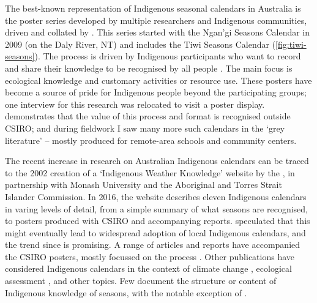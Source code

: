 The best-known representation of Indigenous seasonal calendars in Australia
is the poster series developed by multiple researchers and Indigenous
communities, driven and collated by \citet{CSIROcals}.  This series started with the
Ngan'gi Seasons Calendar in 2009 (on the Daly River, NT) and includes the Tiwi Seasons Calendar
(\cref{fig:tiwi-seasons}).  The process is driven by Indigenous participants
who want to record and share their knowledge to be recognised by all people
\citep{woodward2010,oconnor2010}.  The main focus is ecological knowledge and
customary activities or resource use.  These posters have become a source of
pride for Indigenous people beyond the participating groups; one interview
for this research was relocated to visit a poster display.  \citet{gotha2012}
demonstrates that the value of this process and format is recognised outside
CSIRO; and during fieldwork I saw many more such calendars in the `grey
literature' -- mostly produced for remote-area schools and community centers.


The recent increase in research on Australian Indigenous calendars can be
traced to the 2002 creation of a `Indigenous Weather Knowledge' website by the
\citet{BOM-iwk}, in partnership with Monash University and the Aboriginal and
Torres Strait Islander Commission.  In 2016, the website describes eleven
Indigenous calendars in varing levels of detail, from a simple summary of what
seasons are recognised, to posters produced with CSIRO and accompanying reports.
\citet{kingsley2003} speculated that this might eventually lead
to widespread adoption of local Indigenous calendars, and the trend since is promising.
%
A range of articles and reports have accompanied the CSIRO posters, mostly
focussed on the process \citep[eg.][]{woodward2010,oconnor2010}.  Other
publications have considered Indigenous calendars in the context of
climate change \citep[eg.][]{green2010a,green2010b},
ecological assessment \citep[eg.][]{ens2012,prober2011}, and other topics.
Few document the structure or content of Indigenous knowledge of seasons, with
the notable exception of \citet[eg.][]{woodward2012b}.


